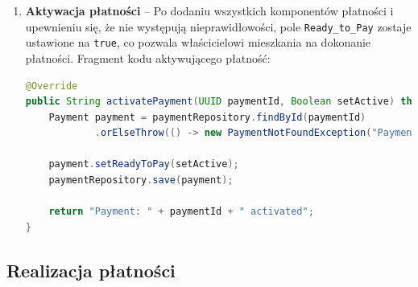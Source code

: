 \begin{enumerate}
\begin{lstlisting}[language=Java, style=JavaStyle, caption=Fragment metody \texttt{addPaymentComponent}]
@Override
@Transactional
public PaymentResponse addPaymentComponent(UUID paymentId, PaymentComponentRequest paymentComponentRequest) throws PaymentNotFoundException {
    Payment payment = paymentRepository.findById(paymentId)
            .orElseThrow(() -> new PaymentNotFoundException("Payment: " + paymentId + " not found"));

    PaymentComponent paymentComponent = PaymentComponent.builder()
            .payment(payment)
            .componentType(paymentComponentRequest.getComponentType())
            .componentAmount(paymentComponentRequest.getComponentAmount())
            .unitPrice(paymentComponentRequest.getUnitPrice())
            .specialMultiplier(paymentComponentRequest.getSpecialMultiplier())
            .unit(paymentComponentRequest.getUnit())
            .build();

    payment.getPaymentComponents().add(paymentComponent);
    recalculatePaymentAmount(payment);
    paymentRepository.save(payment);

    return getPaymentResponse(payment, paymentComponent);
}
\end{lstlisting}

    \item \textbf{Aktywacja płatności} -- Po dodaniu wszystkich komponentów płatności i upewnieniu się, że nie występują nieprawidłowości, pole \texttt{Ready\_to\_Pay} zostaje ustawione na \texttt{true}, co pozwala właścicielowi mieszkania na dokonanie płatności. Fragment kodu aktywującego płatność:

\begin{lstlisting}[language=Java, style=JavaStyle, caption=Fragment metody \texttt{activatePayment}]
@Override
public String activatePayment(UUID paymentId, Boolean setActive) throws PaymentNotFoundException {
    Payment payment = paymentRepository.findById(paymentId)
            .orElseThrow(() -> new PaymentNotFoundException("Payment: " + paymentId + " not found"));

    payment.setReadyToPay(setActive);
    paymentRepository.save(payment);

    return "Payment: " + paymentId + " activated";
}
\end{lstlisting}
\end{enumerate}

\subsection{Realizacja płatności}

